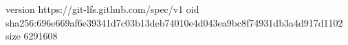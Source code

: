 version https://git-lfs.github.com/spec/v1
oid sha256:696e669af6e39341d7c03b13deb74010e4d043ea9bc8f74931db3a4d917d1102
size 6291608

